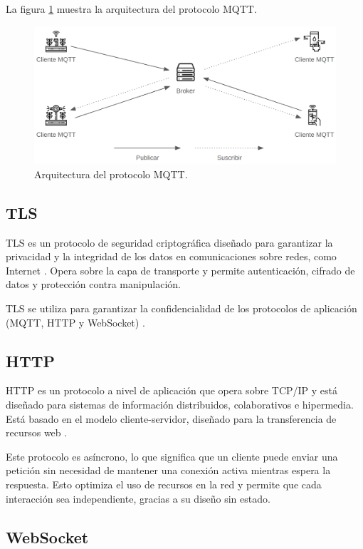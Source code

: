La figura \ref{fig:MqttProtocol} muestra la arquitectura del protocolo MQTT.

\begin{figure}[H]
	\centering
	\includegraphics[width=.95\textwidth]{./Images/2.png}
	\caption{Arquitectura del protocolo MQTT.}
	\label{fig:MqttProtocol}
\end{figure}

\subsection{TLS}

TLS es un protocolo de seguridad criptográfica diseñado para garantizar la
privacidad y la integridad de los datos en comunicaciones sobre redes, como
Internet \cite{tls}. Opera sobre la capa de transporte y permite autenticación,
cifrado de datos y protección contra manipulación.

TLS se utiliza para garantizar la confidencialidad de los protocolos de
aplicación (MQTT, HTTP y WebSocket) \cite{awsiot_tls}.

\subsection{HTTP}

HTTP es un protocolo a nivel de aplicación que opera sobre TCP/IP
\cite{IBMTCPIP} y está diseñado para sistemas de información distribuidos,
colaborativos e hipermedia. Está basado en el modelo cliente-servidor, diseñado
para la transferencia de recursos web \cite{rfc2616}.

Este protocolo es asíncrono, lo que significa que un cliente puede enviar una
petición sin necesidad de mantener una conexión activa mientras espera la
respuesta. Esto optimiza el uso de recursos en la red \cite{MicrosoftHTTPAsync}
y permite que cada interacción sea independiente, gracias a su diseño sin
estado.

\subsection{WebSocket}

